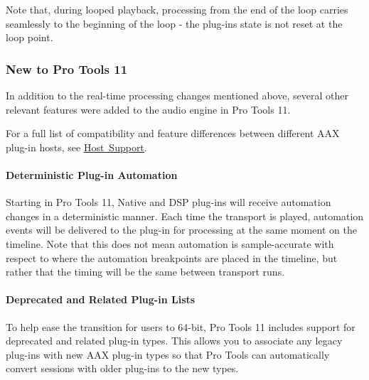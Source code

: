 Note that, during looped playback, processing from the end of the loop carries seamlessly to the beginning of the loop -\/ the plug-\/in\textquotesingle{}s state is not reset at the loop point.

\hypertarget{a00830_subsection__new_to_pro_tools_11}{}\subsubsection{New to Pro Tools 11}\label{a00830_subsection__new_to_pro_tools_11}
 In addition to the real-\/time processing changes mentioned above, several other relevant features were added to the audio engine in Pro Tools 11.

For a full list of compatibility and feature differences between different A\+AX plug-\/in hosts, see \mbox{\hyperlink{a00845}{Host Support}}.

\hypertarget{a00830_subsubsection__deterministic_plug-in_automation}{}\paragraph{Deterministic Plug-\/in Automation}\label{a00830_subsubsection__deterministic_plug-in_automation}
 Starting in Pro Tools 11, Native and D\+SP plug-\/ins will receive automation changes in a deterministic manner. Each time the transport is played, automation events will be delivered to the plug-\/in for processing at the same moment on the timeline. Note that this does not mean automation is sample-\/accurate with respect to where the automation breakpoints are placed in the timeline, but rather that the timing will be the same between transport runs.

\hypertarget{a00830_subsubsection__deprecated_and_related_plug-in_lists}{}\paragraph{Deprecated and Related Plug-\/in Lists}\label{a00830_subsubsection__deprecated_and_related_plug-in_lists}
 To help ease the transition for users to 64-\/bit, Pro Tools 11 includes support for deprecated and related plug-\/in types. This allows you to associate any legacy plug-\/ins with new A\+AX plug-\/in types so that Pro Tools can automatically convert sessions with older plug-\/ins to the new types.

